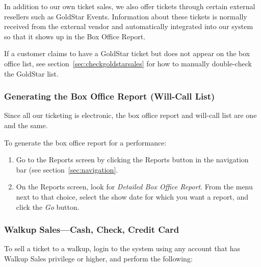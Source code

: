 In addition to our own ticket sales, we also offer tickets through
certain external resellers such as GoldStar Events.  Information about
these tickets is normally received from the external vendor and
automatically integrated into our system so that it shows up in the Box
Office Report.

If a customer claims to have a GoldStar ticket but does not appear on
the box office list, see section~\ref{sec:checkgoldstarsales} for how to
manually double-check the GoldStar list.

\subsubsection{Generating the Box Office Report (Will-Call List)}

Since all our ticketing is electronic, the box office report and
will-call list are one and the same.

To generate the box office report for a performance:

\begin{enumerate}
\item Go to the Reports screen by clicking the Reports button in the
  navigation bar (see section~\ref{sec:navigation}.
\item On the Reports screen, look for \emph{Detailed Box Office
    Report}.  From the menu next to that choice, select the show date
  for which you want a report, and click the \emph{Go} button.
\end{enumerate}

\subsubsection{Walkup Sales---Cash, Check, Credit Card}
\label{sec:walkupsales}

To sell a ticket to a walkup, login to the system using any account that
has Walkup Sales privilege or higher, and perform the following:

